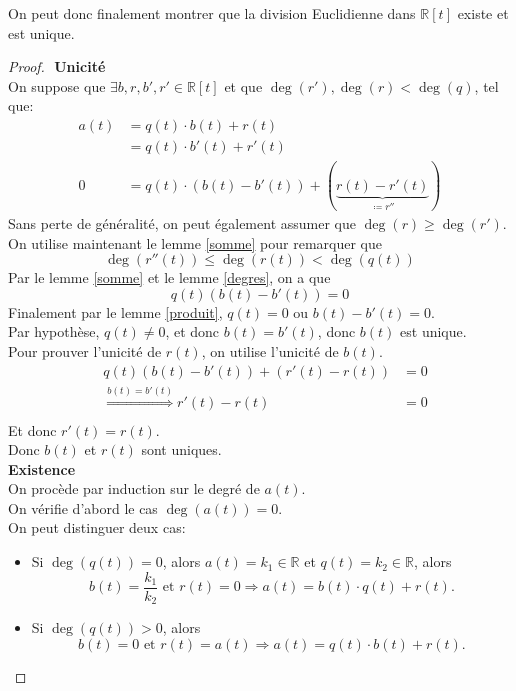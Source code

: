 \documentclass[11pt, a4paper, twoside]{article}
\begin{document}
On peut donc finalement montrer que la division Euclidienne dans $\mathbb{R}[t]$ existe et est unique.
\begin{proof}
$ $\newline
\textbf{Unicité}\\
On suppose que $\exists b,r,b',r' \in \mathbb{R}[t]$ et que $\deg(r'),\deg(r) < \deg(q)$, tel que:
\begin{align*}
	a(t) &= q(t) \cdot b(t) + r(t)\\
	     &= q(t) \cdot b'(t) + r'(t)\\
	0 &= q(t) \cdot(b(t) - b'(t)) + (\underbrace{  r(t) - r'(t) }_{\coloneqq r''}) 
\end{align*}
Sans perte de généralité, on peut également assumer que $\deg(r) \geq \deg(r')$.\\
On utilise maintenant le lemme \ref{somme} pour remarquer que
\[ 
	\deg(r''(t)) \leq \deg(r(t)) < \deg(q(t))
\]
Par le lemme \ref{somme} et le lemme \ref{degres}, on a que 
\[ 
	q(t)(b(t) - b'(t)) = 0
\]
Finalement par le lemme \ref{produit}, $q(t)=0$ ou $b(t)-b'(t)=0$.\\
Par hypothèse, $q(t)\neq 0$, et donc $b(t) = b'(t) $, donc $b(t)$ est unique.\\
Pour prouver l'unicité de $r(t)$, on utilise l'unicité de $b(t)$.
\begin{align*}
&q(t)(b(t) - b'(t)) + ( r'(t) - r(t)) &= 0\\
&\overset{b(t)=b'(t)}{\Rightarrow}  r'(t) - r(t) &= 0\\
\end{align*}
Et donc $r'(t)=r(t)$.\\
Donc $b(t)$ et $r(t)$ sont uniques.\\

\textbf{Existence}\\
On procède par induction sur le degré de $a(t)$.\\
On vérifie d'abord le cas $\deg(a(t))=0$.\\
On peut distinguer deux cas:
\begin{itemize}
	\item Si $\deg(q(t))=0$, alors $a(t) = k_1 \in \mathbb{R}$ et $q(t) = k_2 \in \mathbb{R}$, alors
\[ 
	b(t) = \frac{k_1}{k_2} \text{ et } r(t)=0 \Rightarrow a(t) = b(t) \cdot q(t) + r(t)
.\]
\item Si $\deg(q(t))> 0$, alors
\[ 
	b(t) = 0  \text{ et } r(t) = a(t) \Rightarrow  a(t) = q(t) \cdot b(t) + r(t)
.\]


\end{itemize}
\end{proof}
\end{document}

